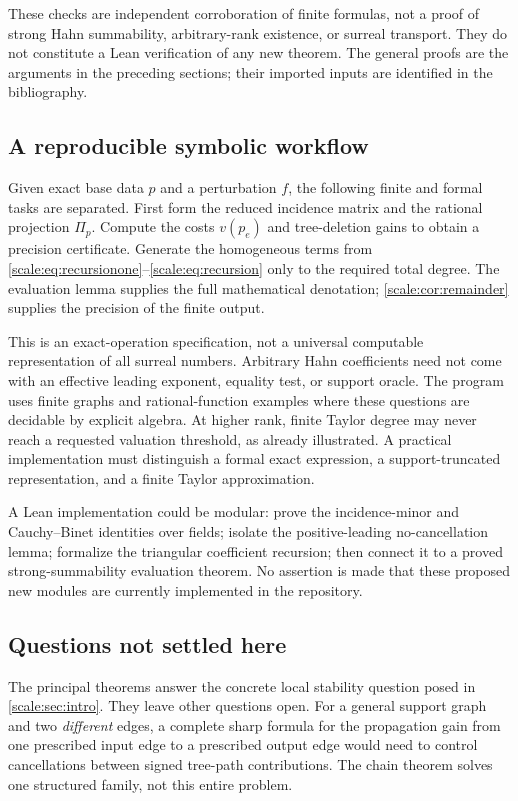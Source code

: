 \documentclass[11pt,a4paper]{article}
\numberwithin{equation}{section}
\theoremstyle{definition}
\begin{document}
These checks are independent corroboration of finite formulas, not
a proof of strong Hahn summability, arbitrary-rank existence, or
surreal transport. They do not constitute a Lean verification of any
new theorem. The general proofs are the arguments in the preceding
sections; their imported inputs are identified in the bibliography.

\subsection{A reproducible symbolic workflow}
Given exact base data $p$ and a perturbation $f$, the following finite
and formal tasks are separated.
First form the reduced incidence matrix and the rational projection
$\Pi_p$. Compute the costs $v(p_e)$ and tree-deletion gains to obtain
a precision certificate. Generate the homogeneous terms from
\eqref{scale:eq:recursionone}--\eqref{scale:eq:recursion} only to the
required total degree. The evaluation lemma supplies the full
mathematical denotation; \cref{scale:cor:remainder} supplies the
precision of the finite output.

This is an exact-operation specification, not a universal computable
representation of all surreal numbers. Arbitrary Hahn coefficients
need not come with an effective leading exponent, equality test, or
support oracle. The program uses finite graphs and rational-function
examples where these questions are decidable by explicit algebra.
At higher rank, finite Taylor degree may never reach a requested
valuation threshold, as already illustrated. A practical
implementation must distinguish a formal exact expression, a
support-truncated representation, and a finite Taylor approximation.

A Lean implementation could be modular: prove the incidence-minor and
Cauchy--Binet identities over fields; isolate the positive-leading
no-cancellation lemma; formalize the triangular coefficient recursion;
then connect it to a proved strong-summability evaluation theorem.
No assertion is made that these proposed new modules are currently
implemented in the repository.

\subsection{Questions not settled here}
The principal theorems answer the concrete local stability question
posed in \cref{scale:sec:intro}. They leave other questions open.
For a general support graph and two \emph{different} edges, a complete
sharp formula for the propagation gain from one prescribed input
edge to a prescribed output edge would need to control cancellations
between signed tree-path contributions. The chain theorem solves
one structured family, not this entire problem.
\end{document}
